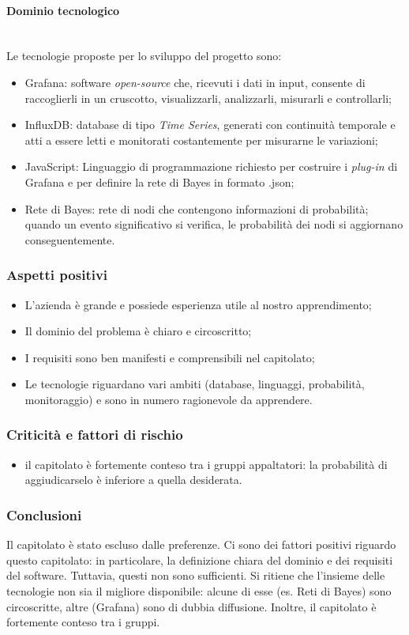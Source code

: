 \paragraph {Dominio tecnologico} \mbox{} \\
Le tecnologie proposte per lo sviluppo del progetto sono:
\begin{itemize}
	\item Grafana: software \textit{open-source} che, ricevuti i dati in input, consente di raccoglierli in un cruscotto, visualizzarli, analizzarli, misurarli e controllarli;
	\item InfluxDB: database di tipo \textit{Time Series}, generati con continuità temporale e atti a essere letti e monitorati costantemente per misurarne le variazioni;
	\item JavaScript: Linguaggio di programmazione richiesto per costruire i \textit{plug-in} di Grafana e per definire la rete di Bayes in formato .json;
	\item Rete di Bayes: rete di nodi che contengono informazioni di probabilità; quando un evento significativo si verifica, le probabilità dei nodi si aggiornano conseguentemente.
\end{itemize}
\subsubsection{Aspetti positivi}
\begin{itemize}
	\item L'azienda è grande e possiede esperienza utile al nostro apprendimento;
	\item Il dominio del problema è chiaro e circoscritto;
	\item I requisiti sono ben manifesti e comprensibili nel capitolato;
	\item Le tecnologie riguardano vari ambiti (database, linguaggi, probabilità, monitoraggio) e sono in numero ragionevole da apprendere.
\end{itemize}
\subsubsection{Criticità e fattori di rischio}
\begin{itemize}
	\item il capitolato è fortemente conteso tra i gruppi appaltatori: la probabilità di aggiudicarselo è inferiore a quella desiderata.
\end{itemize}
\subsubsection{Conclusioni}
Il capitolato è stato escluso dalle preferenze. Ci sono dei fattori positivi riguardo questo capitolato: in particolare, la definizione chiara del dominio e dei requisiti del software.
Tuttavia, questi non sono sufficienti.
Si ritiene che l'insieme delle tecnologie non sia il migliore disponibile: alcune di esse (es. Reti di Bayes) sono circoscritte, altre (Grafana) sono di dubbia diffusione. Inoltre, il capitolato è fortemente conteso tra i gruppi. 